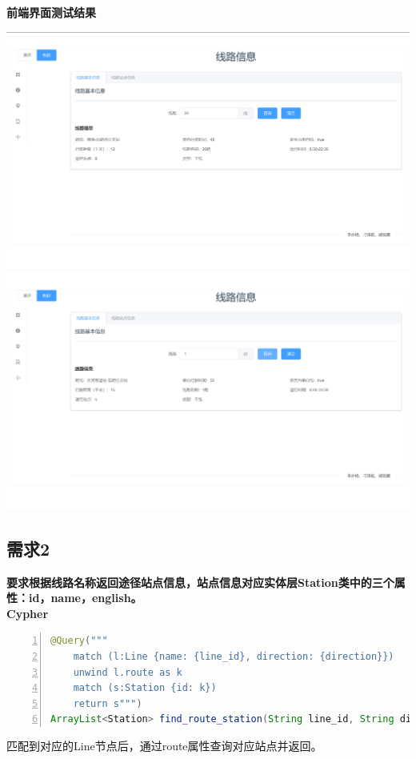 \documentclass[11pt,a4paper]{article}
\begin{document}
\textbf{前端界面测试结果} \\
\begin{center}
\centering
\includegraphics[scale=0.3]{./assets/demand1_1.png} \\ 
\includegraphics[scale=0.3]{./assets/demand1_2.png} 
\end{center}

\subsection{需求2}
\textbf{要求根据线路名称返回途径站点信息，站点信息对应实体层Station类中的三个属性：id，name，english。} \\
\textbf{Cypher} \\
\begin{lstlisting}[numbers = left, 
showstringspaces=false,
showspaces = false,
breaklines = true, 
language=Java]
@Query("""
	match (l:Line {name: {line_id}, direction: {direction}}) 
	unwind l.route as k
	match (s:Station {id: k})
	return s""")
ArrayList<Station> find_route_station(String line_id, String direction
\end{lstlisting} 
匹配到对应的Line节点后，通过route属性查询对应站点并返回。
\end{document}
